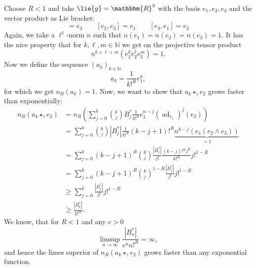 \begin{example}
	\label{Nilpot:Ex:NoModulesInGeneral}
	Choose $R < 1$ and take $\lie{g} = \mathbbm{R}^3$ with the basis $e_1, e_2, 
	e_3$ and the vector product as Lie bracket:
	\begin{equation*}
		[e_1, e_2] 
		= 
		e_3 
		\qquad 
		[e_2, e_3] 
		= 
		e_1 
		\qquad 
		[e_3, e_1] 
		= 
		e_2
	\end{equation*}
	Again, we take a $\ell^1$-norm $n$ such that $n(e_1) = n(e_2) = n(e_3) 
	= 1$. It has the nice property that for $k, \ell, m \in \mathbb{N}$ we get
	on the projective tensor product
	\begin{equation*}
		n^{k + \ell + m} \left(
			e_1^k e_2^{\ell} e_3^m
		\right)
		=
		1.
	\end{equation*}
	Now we define the sequence $(a_k)_{k \in \mathbb{N}}$
	\begin{equation*}
		a_k 
		= 
		\frac{1}{k!^R} e_1^k,
	\end{equation*}
	for which we get $n_R(a_k) = 1$. Now, we want to show that 
	$a_k \star_z e_2$ grows faster than exponentially:
	\begin{align*}
		n_R \left( a_k \star_z e_2 \right) 
		& = 
		n_R \left( 
			\sum\limits_{j = 0}^k 
			\binom{k}{j} B_j^* 
			\frac{1}{k!^R} 
			e_1^{n-j} 
			\left( 
				\operatorname{ad}_{e_1} 
			\right)^j(e_2) 
		\right)
		\\
		& =
		\sum\limits_{j = 0}^k 
		\binom{k}{j} 
		|B_j^*| 
		\frac{1}{k!^R} 
		(k-j+1)!^R 
		\underbrace{
			n^{k-j} \left( e_1 (e_2 \wedge e_3) \right)
		}_{ = 1}
		\\
		& = 
		\sum\limits_{j = 0}^k 
		(k-j+1)^R 
		\binom{k}{j}
		\frac{|B_j^*|}{j!} 
		\frac{(k-j)!^R j^R}{k!^R} 
		j!^{1-R}
		\\
		& = 
		\sum\limits_{j=0}^k 
		(k-j+1)^R 
		\binom{k}{j}^{1-R} 
		\frac{|B_j^*|}{j!} 
		j!^{1-R}
		\\
		& \geq 
		\sum\limits_{j=0}^k 
		\frac{|B_j^*|}{j!} 
		j!^{1-R}
		\\
		& \geq 
		\frac{|B_k^*|}{k!^R}.
	\end{align*}
	We know, that for $R < 1$ and any $c > 0$
	\begin{equation*}
		\limsup_{n \longrightarrow \infty}
		\frac{|B_n^*|}{c^n n!^R}
		=
		\infty,
	\end{equation*}
	and hence the limes superior of $n_R \left( a_k \star_z e_2 \right) $ grows 
	faster than any exponential function.
\end{example}



